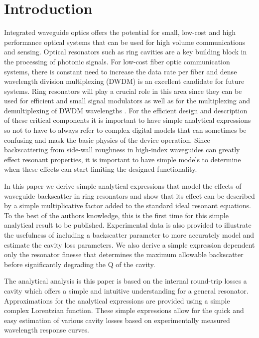 \documentclass[10pt]{article}
\begin{document}
\section{Introduction}

Integrated waveguide optics offers the potential for small, low-cost and high performance optical systems that can be used for high volume communications and sensing.   Optical resonators such as ring cavities are a key building block in the processing of photonic signals.    For low-cost  fiber optic communication systems, there is constant need to increase the data rate per fiber and dense wavelength division multiplexing (DWDM) is an excellent candidate for future systems.  Ring resonators will play a crucial role in this area since they can be used for efficient and small signal modulators as well as for the multiplexing and demultiplexing of  DWDM wavelengths  \cite{Little1997a,Bogaerts:12}.   For the efficient design and description of these critical components it is important to have simple analytical expressions so not to have to always refer to complex digital models that can sometimes be confusing and mask the basic physics of the device operation.   Since backscattering from side-wall roughness in high-index waveguides can greatly effect resonant properties, it is important to have simple models to determine when these effects can start limiting the designed functionality.   \cite{Ballesteros2011,Canciamilla2009,Little1997,Morichetti2010c,Li2016}

In this paper we derive simple analytical expressions that model the effects of waveguide  backscatter in ring resonators and show that its effect can be described by a simple multiplicative factor added to the standard ideal resonant equations.   To the best of the authors knowledge, this is the first time for this simple analytical result to be published. Experimental data is also provided to illustrate the usefulness of including a backscatter parameter to more accurately model and estimate the cavity loss parameters.  We also derive a simple expression dependent only the resonator finesse that determines the maximum allowable backscatter before significantly degrading the Q of the cavity.   

The analytical analysis is this paper is based on the internal round-trip losses a cavity which offers a simple and intuitive understanding for a general resonator. Approximations for the analytical expressions are provided using a simple complex Lorentzian function.  These simple expressions allow for the quick and easy estimation of various cavity losses based on experimentally measured wavelength response curves.  
\end{document}
